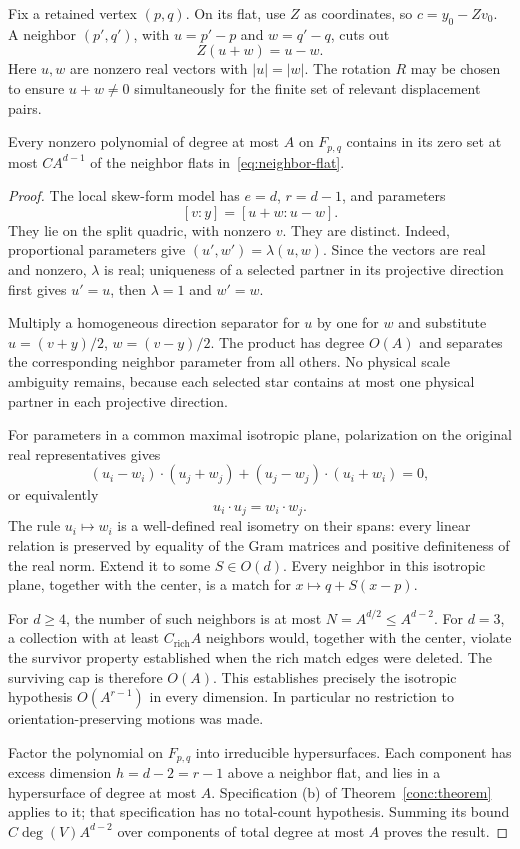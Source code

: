 Fix a retained vertex \((p,q)\). On its flat, use \(Z\) as coordinates,
so \(c=y_0-Zv_0\). A neighbor \((p',q')\), with
\(u=p'-p\) and \(w=q'-q\), cuts out
\begin{equation}\label{eq:neighbor-flat}
 Z(u+w)=u-w.
\end{equation}
Here \(u,w\) are nonzero real vectors with \(|u|=|w|\).
The rotation \(R\) may be chosen to ensure \(u+w\ne0\) simultaneously
for the finite set of relevant displacement pairs.

\begin{lemma}\label{red:local-concentration}
Every nonzero polynomial of degree at most \(A\) on \(F_{p,q}\)
contains in its zero set at most \(C A^{d-1}\) of the neighbor flats
in~\eqref{eq:neighbor-flat}.
\end{lemma}

\begin{proof}
The local skew-form model has \(e=d\), \(r=d-1\), and parameters
\[
 [v:y]=[u+w:u-w].
\]
They lie on the split quadric, with nonzero \(v\).
They are distinct. Indeed, proportional parameters give
\((u',w')=\lambda(u,w)\). Since the vectors are real and nonzero,
\(\lambda\) is real; uniqueness of a selected partner in its projective
direction first gives \(u'=u\), then \(\lambda=1\) and \(w'=w\).

Multiply a homogeneous direction separator for \(u\) by one for \(w\)
and substitute \(u=(v+y)/2\), \(w=(v-y)/2\).
The product has degree \(O(A)\) and separates the corresponding
neighbor parameter from all others. No physical scale ambiguity
remains, because each selected star contains at most one physical
partner in each projective direction.

For parameters in a common maximal isotropic plane, polarization on
the original real representatives gives
\[
 (u_i-w_i)\cdot(u_j+w_j)
 +(u_j-w_j)\cdot(u_i+w_i)=0,
\]
or equivalently
\[
 u_i\cdot u_j=w_i\cdot w_j.
\]
The rule \(u_i\mapsto w_i\) is a well-defined real isometry on their
spans: every linear relation is preserved by equality of the Gram
matrices and positive definiteness of the real norm.
Extend it to some \(S\in O(d)\). Every neighbor in this isotropic
plane, together with the center, is a match for
\(x\mapsto q+S(x-p)\).

For \(d\ge4\), the number of such neighbors is at most
\(N=A^{d/2}\le A^{d-2}\). For \(d=3\), a collection with at least
\(C_{\mathrm{rich}}A\) neighbors would, together with the center,
violate the survivor property established when the rich match edges
were deleted. The surviving cap is therefore
\(O(A)\). This establishes precisely the isotropic hypothesis
\(O(A^{r-1})\) in every dimension. In particular no restriction to
orientation-preserving motions was made.

Factor the polynomial on \(F_{p,q}\) into irreducible hypersurfaces.
Each component has excess dimension \(h=d-2=r-1\) above a neighbor
flat, and lies in a hypersurface of degree at most \(A\).
Specification (b) of Theorem~\ref{conc:theorem} applies to it; that
specification has no total-count hypothesis. Summing its bound
\(C\deg(V)A^{d-2}\) over components of total degree at most \(A\)
proves the result.
\end{proof}


